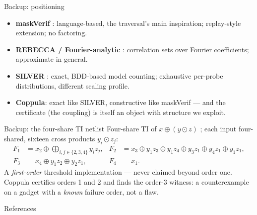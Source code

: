 \documentclass[aspectratio=169,10pt]{beamer}
\newcommand{\toolname}{Coppula}
\begin{document}
\begin{frame}{Backup: positioning}
  \begin{itemize}
    \item \textbf{maskVerif} \parencite{10.1007/978-3-030-29959-0_15}:
      language-based, the traversal's
      main inspiration; replay-style extension; no factoring.
    \item \textbf{REBECCA / Fourier-analytic} \parencite{bloem2018formal}:
      correlation sets over Fourier coefficients; approximate in general.
    \item \textbf{SILVER} \parencite{knichel2020silver}: exact, BDD-based model counting;
      exhaustive per-probe distributions, different scaling profile.
    \item \textbf{\toolname}: exact like SILVER, constructive like maskVerif ---
      and the certificate (the coupling) is itself an object with structure
      we exploit.
  \end{itemize}
\end{frame}

\begin{frame}{Backup: the four-share TI netlist}
  Four-share TI of $x \oplus (y \odot z)$ \parencite{bilgin2015threshold}; each input
  four-shared, sixteen cross products $y_i \odot z_j$:
  \[
  \begin{aligned}
    F_1 &= x_2 \oplus \textstyle\bigoplus_{i,j \in \{2,3,4\}} y_i z_j, &
    F_2 &= x_3 \oplus y_1 z_3 \oplus y_1 z_4 \oplus y_3 z_1 \oplus y_4 z_1 \oplus y_1 z_1, \\
    F_3 &= x_4 \oplus y_1 z_2 \oplus y_2 z_1, &
    F_4 &= x_1.
  \end{aligned}
  \]
  A \emph{first-order} threshold implementation --- never claimed beyond order
  one. \toolname{} certifies orders 1 and 2 and finds the order-3 witness:
  a counterexample on a gadget with a \emph{known} failure order, not a flaw.
\end{frame}

\begin{frame}[allowframebreaks]{References}
  \printbibliography[heading=none]
\end{frame}
\end{document}

